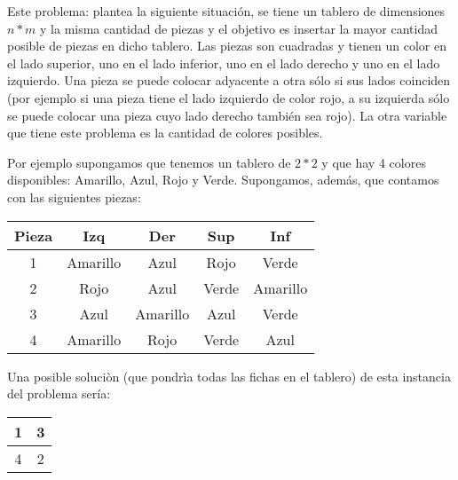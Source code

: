 Este problema: plantea la siguiente situación, se tiene un tablero de dimensiones $n*m$ y la misma cantidad de piezas y el objetivo es insertar la mayor cantidad posible de piezas en dicho tablero. Las piezas son cuadradas y tienen un color en el lado superior, uno en el lado inferior, uno en el lado derecho y uno en el lado izquierdo. Una pieza se puede colocar adyacente a otra sólo si sus lados coinciden (por ejemplo si una pieza tiene el lado izquierdo de color rojo, a su izquierda sólo se puede colocar una pieza cuyo lado derecho también sea rojo). La otra variable que tiene este problema es la cantidad de colores posibles.

Por ejemplo supongamos que tenemos un tablero de $2*2$ y que hay 4 colores disponibles: Amarillo, Azul, Rojo y Verde. Supongamos, además, que contamos con las siguientes piezas:
\begin{center}
\begin{tabular}{c|c|c|c|c}
 Pieza & Izq & Der & Sup & Inf \\
 \hline
 1 & Amarillo & Azul & Rojo & Verde \\
 2 & Rojo & Azul & Verde & Amarillo \\
 3 & Azul & Amarillo & Azul & Verde \\
 4 & Amarillo & Rojo & Verde & Azul \\
\end{tabular}
\end{center}

Una posible soluciòn (que pondrìa todas las fichas en el tablero) de esta instancia del problema sería:
\begin{center}
\begin{tabular}{|c|c|}
  \hline
  1 & 3 \\
  \hline
  4 & 2 \\
  \hline  
\end{tabular}
\end{center}
